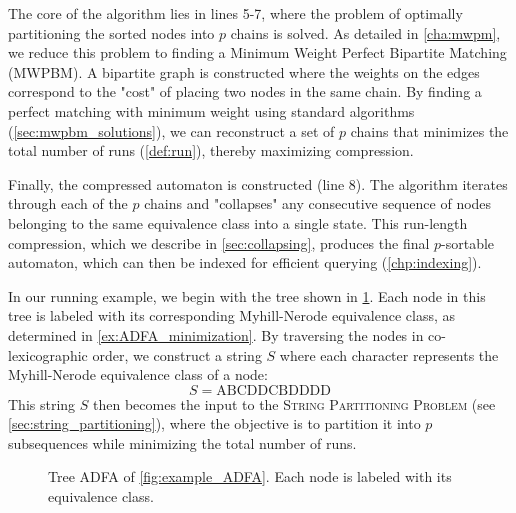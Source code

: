 The core of the algorithm lies in lines 5-7, where the problem of optimally partitioning the sorted nodes into $p$ chains is solved. As detailed in \cref{cha:mwpm}, we reduce this problem to finding a Minimum Weight Perfect Bipartite Matching (MWPBM). A bipartite graph is constructed where the weights on the edges correspond to the "cost" of placing two nodes in the same chain. By finding a perfect matching with minimum weight using standard algorithms (\cref{sec:mwpbm_solutions}), we can reconstruct a set of $p$ chains that minimizes the total number of runs (\cref{def:run}), thereby maximizing compression.

Finally, the compressed automaton is constructed (line 8). The algorithm iterates through each of the $p$ chains and "collapses" any consecutive sequence of nodes belonging to the same equivalence class into a single state. This run-length compression, which we describe in \cref{sec:collapsing}, produces the final $p$-sortable automaton, which can then be indexed for efficient querying (\cref{chp:indexing}).

\begin{example} \label{ex:string_example}
    In our running example, we begin with the tree shown in \cref{fig:original_tree}. Each node in this tree is labeled with its corresponding Myhill-Nerode equivalence class, as determined in \cref{ex:ADFA_minimization}. By traversing the nodes in co-lexicographic order, we construct a string $S$ where each character represents the Myhill-Nerode equivalence class of a node:
    \[
        S = \text{ABCDDCBDDDD}
    \]
    This string $S$ then becomes the input to the \textsc{String Partitioning Problem} (see \cref{sec:string_partitioning}), where the objective is to partition it into $p$ subsequences while minimizing the total number of runs.

    \begin{figure}[H]
        \centering
        \caption{Tree ADFA of \cref{fig:example_ADFA}. Each node is labeled with its equivalence class.}
        \label{fig:original_tree}
    \end{figure}
\end{example}